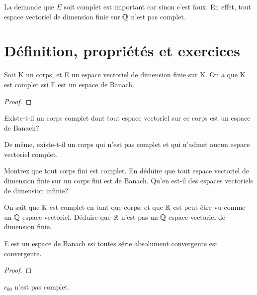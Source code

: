 \begin{remarque}
	La demande que $E$ soit complet est important car sinon c'est faux. En
	effet, tout espace vectoriel de dimension finie sur $\mathbb{Q}$ n'est pas
	complet.
\end{remarque}

\section{Définition, propriétés et exercices}


\begin{proposition}
	Soit K un corps, et E un espace vectoriel de dimension finie sur K. On a que
	K est complet ssi E est un espace de Banach.
\end{proposition}

\ifdefined\outputproof
\begin{proof}

\end{proof}
\fi

\begin{question}
	Existe-t-il un corps complet dont tout espace vectoriel sur ce corps est un
	espace de Banach?

	De même, existe-t-il un corps qui n'est pas complet et qui n'admet aucun
	espace vectoriel complet.
\end{question}

\begin{exercice}
	Montrez que tout corps fini est complet. En déduire que tout espace
	vectoriel de dimension finie sur un corps fini est de Banach. Qu'en est-il
	des espaces vectoriels de dimension infinie?
\end{exercice}

\begin{exercice}
	On sait que $\mathbb{R}$ est complet en tant que corps, et que $\mathbb{R}$ est
	peut-être vu comme un $\mathbb{Q}$-espace vectoriel. Déduire que $\mathbb{R}$
	n'est pas un $\mathbb{Q}$-espace vectoriel de dimension finie.
\end{exercice}

\begin{proposition}
	E est un espace de Banach ssi toutes série absolument convergente
	est convergente.
\end{proposition}

\ifdefined\outputproof
\begin{proof}

\end{proof}
\fi

\begin{exemple}
	$c_{00}$ n'est pas complet.
\end{exemple}

